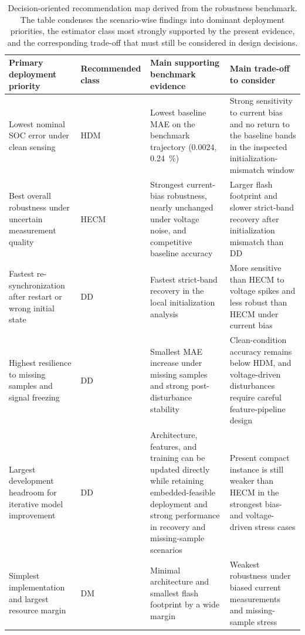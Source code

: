 \documentclass[
    a4paper,
    12pt,
    titlepage,
    bibliography=totoc,
    twoside=on,
    parskip=false,
    numbers=noenddot,
    cleardoublepage=empty,
    DIV=12,
    BCOR=12.0mm,
    headheight=36pt,
    headings=openright
]{scrreprt}
\begin{document}
\begin{table}[H]
    \centering
    \small
    \caption[Decision-oriented recommendation map for estimator selection.]{Decision-oriented recommendation map derived from the robustness benchmark. The table condenses the scenario-wise findings into dominant deployment priorities, the estimator class most strongly supported by the present evidence, and the corresponding trade-off that must still be considered in design decisions.}
    \label{tab:robustness_decision_guidance}
    \begin{tabularx}{\textwidth}{>{\raggedright\arraybackslash}p{3.0cm}>{\raggedright\arraybackslash}p{2.4cm}>{\raggedright\arraybackslash}X>{\raggedright\arraybackslash}X}
        \toprule
        Primary deployment priority & Recommended class & Main supporting benchmark evidence & Main trade-off to consider \\
        \midrule
        Lowest nominal SOC error under clean sensing & HDM & Lowest baseline MAE on the benchmark trajectory ($0.0024$, \SI{0.24}{\percent}) & Strong sensitivity to current bias and no return to the baseline bands in the inspected initialization-mismatch window \\
        Best overall robustness under uncertain measurement quality & HECM & Strongest current-bias robustness, nearly unchanged under voltage noise, and competitive baseline accuracy & Larger flash footprint and slower strict-band recovery after initialization mismatch than DD \\
        Fastest re-synchronization after restart or wrong initial state & DD & Fastest strict-band recovery in the local initialization analysis & More sensitive than HECM to voltage spikes and less robust than HECM under current bias \\
        Highest resilience to missing samples and signal freezing & DD & Smallest MAE increase under missing samples and strong post-disturbance stability & Clean-condition accuracy remains below HDM, and voltage-driven disturbances require careful feature-pipeline design \\
        Largest development headroom for iterative model improvement & DD & Architecture, features, and training can be updated directly while retaining embedded-feasible deployment and strong performance in recovery and missing-sample scenarios & Present compact instance is still weaker than HECM in the strongest bias- and voltage-driven stress cases \\
        Simplest implementation and largest resource margin & DM & Minimal architecture and smallest flash footprint by a wide margin & Weakest robustness under biased current measurements and missing-sample stress \\
        \bottomrule
    \end{tabularx}
\end{table}
\end{document}
